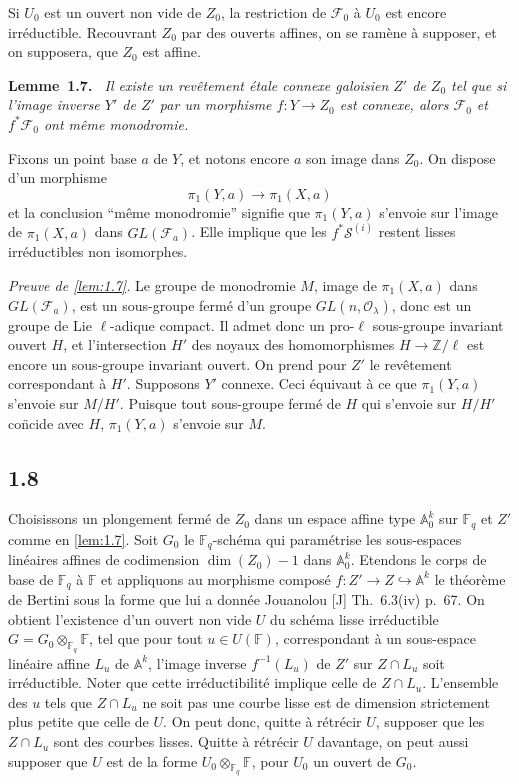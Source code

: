 \documentclass[11pt,a4paper]{article}
\makeatletter
\theoremstyle{plain}
\theoremstyle{definition}
\newenvironment{manualblock}[4]{%
  \par\medskip\noindent\textbf{#1~#2#3.}\def\@currentlabel{#2}\label{#4}\itshape\ }{\par\normalfont\medskip}
\makeatother
\begin{document}
Si $U_0$ est un ouvert non vide de $Z_0$, la restriction de $\mathcal{F}_0$ \`a $U_0$ est encore irr\'eductible. Recouvrant $Z_0$ par des ouverts affines, on se ram\`ene \`a supposer, et on supposera, que $Z_0$ est affine.

\begin{manualblock}{Lemme}{1.7}{}{lem:1.7}
Il existe un rev\^etement \'etale connexe galoisien $Z'$ de $Z_0$ tel que si l'image inverse $Y'$ de $Z'$ par un morphisme $f: Y \to Z_0$ est connexe, alors $\mathcal{F}_0$ et $f^* \mathcal{F}_0$ ont m\^eme monodromie.
\end{manualblock}

Fixons un point base $a$ de $Y$, et notons encore $a$ son image dans $Z_0$. On dispose d'un morphisme
\[
\pi_1(Y,a) \to \pi_1(X,a)
\]
et la conclusion ``m\^eme monodromie'' signifie que $\pi_1(Y,a)$ s'envoie sur l'image de $\pi_1(X,a)$ dans $GL(\mathcal{F}_a)$. Elle implique que les $f^* \mathcal{S}^{(i)}$ restent lisses irr\'eductibles non isomorphes.

\noindent\textit{Preuve de \ref{lem:1.7}.} Le groupe de monodromie $M$, image de $\pi_1(X,a)$ dans $GL(\mathcal{F}_a)$, est un sous-groupe ferm\'e d'un groupe $GL(n, \mathcal{O}_\lambda)$, donc est un groupe de Lie $\ell$-adique compact. Il admet donc un pro-$\ell$ sous-groupe invariant ouvert $H$, et l'intersection $H'$ des noyaux des homomorphismes $H \to \mathbb{Z}/\ell$ est encore un sous-groupe invariant ouvert. On prend pour $Z'$ le rev\^etement correspondant \`a $H'$. Supposons $Y'$ connexe. Ceci \'equivaut \`a ce que $\pi_1(Y,a)$ s'envoie sur $M/H'$. Puisque tout sous-groupe ferm\'e de $H$ qui s'envoie sur $H/H'$ co\"ncide avec $H$, $\pi_1(Y,a)$ s'envoie sur $M$.

\subsection*{1.8}

Choisissons un plongement ferm\'e de $Z_0$ dans un espace affine type $\mathbb{A}_0^{k}$ sur $\mathbb{F}_q$ et $Z'$ comme en \ref{lem:1.7}. Soit $G_0$ le $\mathbb{F}_q$-sch\'ema qui param\'etrise les sous-espaces lin\'eaires affines de codimension $\dim(Z_0)-1$ dans $\mathbb{A}_0^{k}$. Etendons le corps de base de $\mathbb{F}_q$ \`a $\mathbb{F}$ et appliquons au morphisme compos\'e $f: Z' \to Z \hookrightarrow \mathbb{A}^{k}$ le th\'eor\`eme de Bertini sous la forme que lui a donn\'ee Jouanolou [J] Th.~6.3(iv) p.~67. On obtient l'existence d'un ouvert non vide $U$ du sch\'ema lisse irr\'eductible $G = G_0 \otimes_{\mathbb{F}_q} \mathbb{F}$, tel que pour tout $u \in U(\mathbb{F})$, correspondant \`a un sous-espace lin\'eaire affine $L_u$ de $\mathbb{A}^{k}$, l'image inverse $f^{-1}(L_u)$ de $Z'$ sur $Z \cap L_u$ soit irr\'eductible. Noter que cette irr\'eductibilit\'e implique celle de $Z \cap L_u$. L'ensemble des $u$ tels que $Z \cap L_u$ ne soit pas une courbe lisse est de dimension strictement plus petite que celle de $U$. On peut donc, quitte \`a r\'etr\'ecir $U$, supposer que les $Z \cap L_u$ sont des courbes lisses. Quitte \`a r\'etr\'ecir $U$ davantage, on peut aussi supposer que $U$ est de la forme $U_0 \otimes_{\mathbb{F}_q} \mathbb{F}$, pour $U_0$ un ouvert de $G_0$.
\end{document}
